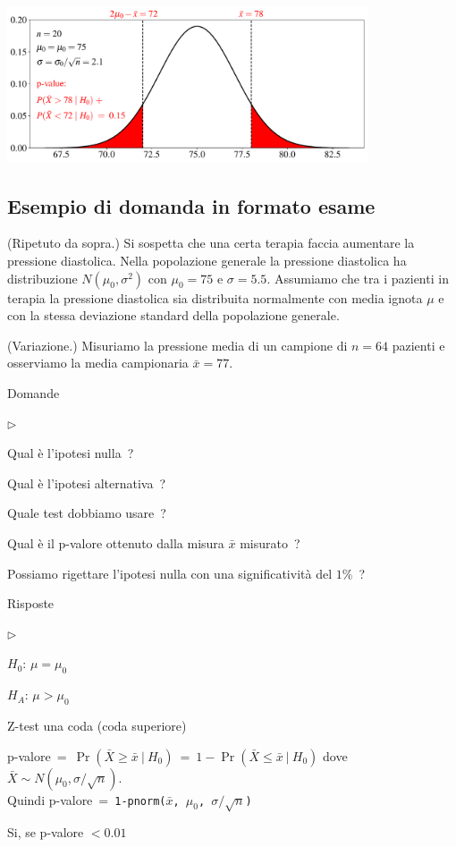 \documentclass[11pt,openany]{book}
\newcommand{\mylabel}[1]{{\footnotesize\textsf{#1}}\hfill}
\renewenvironment{itemize}
  {\begin{list}{$\triangleright$}{%
   \setlength{\parskip}{0mm}
   \setlength{\topsep}{.2\baselineskip}
   \setlength{\rightmargin}{0mm}
   \setlength{\listparindent}{0mm}
   \setlength{\itemindent}{0mm}
   \setlength{\labelwidth}{3ex}
   \setlength{\itemsep}{.4\baselineskip}
   \setlength{\parsep}{0mm}
   \setlength{\partopsep}{0mm}
   \setlength{\labelsep}{1ex}
   \setlength{\leftmargin}{\labelwidth+\labelsep}
   \let\makelabel\mylabel}}{%
   \end{list}\vspace*{-1.3mm}}
\begin{document}
\hfil\includegraphics[width=0.8\textwidth]{figure/Z-test-p-val_02.pdf}

\hfill{}\clearpage\subsection{Esempio di domanda in formato esame}

(Ripetuto da sopra.) Si sospetta che una certa terapia faccia aumentare la pressione diastolica. Nella popolazione generale la pressione diastolica ha distribuzione $N(\mu_0,\sigma^2)$ con $\mu_0=75$ e $\sigma=5.5$. Assumiamo che tra i pazienti in terapia la pressione diastolica sia distribuita normalmente con media ignota $\mu$ e con la stessa deviazione standard della popolazione generale.  

(Variazione.) Misuriamo la pressione media di un campione di $n=64$ pazienti e osserviamo la media campionaria $\bar x=77$.

Domande

\begin{itemize}
\item[1.] Qual è l'ipotesi nulla~?
\item[2.] Qual è l'ipotesi alternativa~?
\item[3.] Quale test dobbiamo usare~?
\item[3.] Qual è il p-valore ottenuto dalla misura $\bar x$ misurato~?
\item[4.] Possiamo rigettare l'ipotesi nulla con una significatività del $1\%$~? 
\end{itemize}

Risposte

\begin{itemize}
\item[1.] $H_0$: $\mu=\mu_0$
\item[2.] $H_A$: $\mu>\mu_0$
\item[3.] Z-test una coda (coda superiore)
\item[3.] p-valore\ =\ $\Pr(\bar X\ge \bar x\ |\ H_0)\ =\ 1-\Pr(\bar X\le \bar x\ |\ H_0)$ dove $\bar X\sim N(\mu_0,\sigma/\sqrt{n})$.\\ Quindi p-valore\ =\ {\tt 1-pnorm($\bar x$,\,$\mu_0$,\,$\sigma/\sqrt{n}$)}
\item[4.] Si, se p-valore $< 0.01$
\end{itemize}
\end{document}
